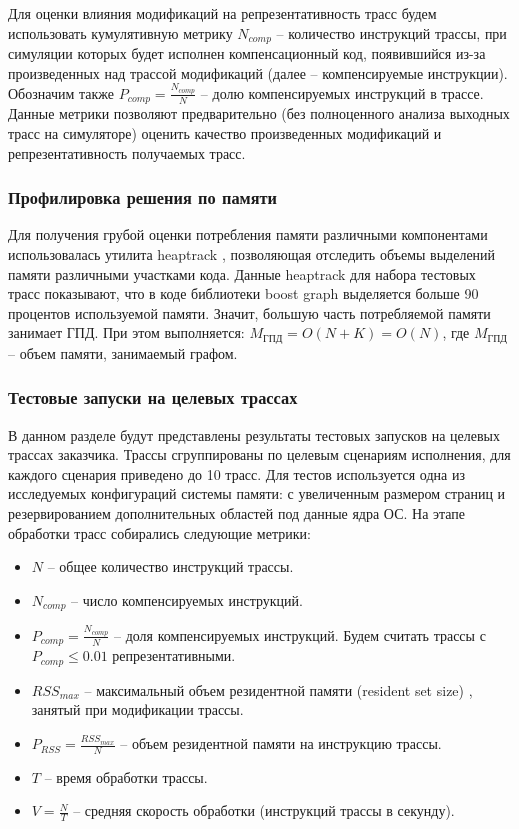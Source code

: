 Для оценки влияния модификаций на репрезентативность трасс будем использовать кумулятивную метрику $N_{comp}$ -- количество инструкций трассы, при симуляции которых будет исполнен компенсационный код, появившийся из-за произведенных над трассой модификаций (далее -- компенсируемые инструкции). Обозначим также $P_{comp} = \frac{N_{comp}}{N}$ -- долю компенсируемых инструкций в трассе. Данные метрики позволяют предварительно (без полноценного анализа выходных трасс на симуляторе) оценить качество произведенных модификаций и репрезентативность получаемых трасс.

\subsubsection{Профилировка решения по памяти} \label{sec:memory_profiling}

Для получения грубой оценки потребления памяти различными компонентами использовалась утилита heaptrack \cite{heaptrack_documentation}, позволяющая отследить объемы выделений памяти различными участками кода. Данные heaptrack для набора тестовых трасс показывают, что в коде библиотеки boost graph выделяется больше 90 процентов используемой памяти. Значит, большую часть потребляемой памяти занимает ГПД. При этом выполняется: $M_{\texttt{ГПД}} = O(N + K) = O(N)$, где $M_{\texttt{ГПД}}$ -- объем памяти, занимаемый графом.

\subsubsection{Тестовые запуски на целевых трассах} \label{sec:real_trace_tests}

В данном разделе будут представлены результаты тестовых запусков на целевых трассах заказчика. Трассы сгруппированы по целевым сценариям исполнения, для каждого сценария приведено до 10 трасс. Для тестов используется одна из исследуемых конфигураций системы памяти: с увеличенным размером страниц и резервированием дополнительных областей под данные ядра ОС. На этапе обработки трасс собирались следующие метрики:

\begin{itemize}
    \item $N$ -- общее количество инструкций трассы.
    \item $N_{comp}$ -- число компенсируемых инструкций.
    \item $P_{comp} = \frac{N_{comp}}{N}$ -- доля компенсируемых инструкций. Будем считать трассы с $P_{comp} \leq 0.01$ репрезентативными.
    \item $RSS_{max}$ -- максимальный объем резидентной памяти (resident set size) \cite{gnu_time_memory_resources,linux_proc_filesystem}, занятый при модификации трассы.
    \item $P_{RSS} = \frac{RSS_{max}}{N}$ -- объем резидентной памяти на инструкцию трассы.
    \item $T$ -- время обработки трассы.
    \item $V = \frac{N}{T}$ -- средняя скорость обработки (инструкций трассы в секунду).
\end{itemize}


